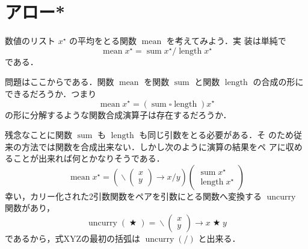 \documentclass[a5paper,twoside,fleqn,draft]{jsbook}
\newcommand{\mAnonParam}{\diamond}
\newcommand{\mSpecialFunc}[1]{#1}
\DeclareMathOperator{\mSum}{\mSpecialFunc{sum}}
\DeclareMathOperator{\mUncurry}{\mSpecialFunc{uncurry}}
\DeclareMathOperator{\mBinOp}{\bigstar}
\DeclareMathOperator{\mLambda}{\backslash}
\DeclareMathOperator{\mLambdaArrow}{\rightarrow}
\newcommand{\mPairWith}[2]{\begin{pmatrix}#1\\#2\end{pmatrix}}
\newcommand{\mList}[1]{{#1}^\mathrm{\star}}
\begin{document}
\section{アロー*}

\newcommand{\mLength}{\mathop{\mathrm{length}}}
\newcommand{\mMean}{\mathop{\mathrm{mean}}}
\newcommand{\mSeparate}{\mathop{\mathrm{separate}}}

数値のリスト $\mList{x}$ の平均をとる関数 $\mMean$ を考えてみよう．実
装は単純で
\begin{equation}
  \mMean\mList{x}=\mSum\mList{x}/\mLength\mList{x}
\end{equation}
である．

問題はここからである．関数 $\mMean$ を関数 $\mSum$ と関数 $\mLength$
の合成の形にできるだろうか．つまり
\begin{equation}
  \mMean\mList{x}=(\mSum\square\mLength)\mList{x}
\end{equation}
の形に分解するような関数合成演算子は存在するだろうか．

残念なことに関数 $\mSum$ も $\mLength$ も同じ引数をとる必要がある．そ
のため従来の方法では関数を合成出来ない．しかし次のように演算の結果をペ
アに収めることが出来れば何とかなりそうである．
\begin{equation}
  \mMean\mList{x}
  =%
  \left(\mLambda\mPairWith{x}{y}\mLambdaArrow x/y\right)
  \begin{pmatrix}
    \mSum\mList{x}\\
    \mLength\mList{x}
  \end{pmatrix}
\end{equation}
幸い，カリー化された2引数関数をペアを引数にとる関数へ変換する
$\mUncurry$ 関数があり，
\begin{equation}
  \mUncurry(\mBinOp)=\mLambda\mPairWith{x}{y}\mLambdaArrow x\mBinOp y
\end{equation}
であるから，式XYZの最初の括弧は $\mUncurry(/)$ と出来る．
\end{document}
